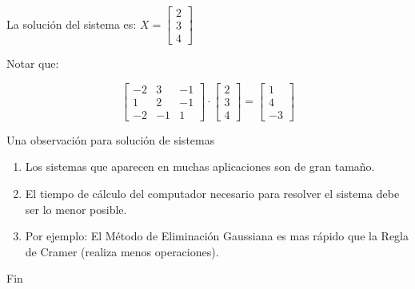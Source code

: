 La solución del sistema es:
$
X=
\begin{bmatrix}
2\\ 
3\\
4
\end{bmatrix}
$

Notar que:

$$\begin{bmatrix}
-2  &  3   & -1\\ 
1   & 2    & -1 \\
-2  &  -1  & 1 
\end{bmatrix}
 \cdot
\begin{bmatrix}
2\\ 
3 \\
4
\end{bmatrix}
=
\begin{bmatrix}
1\\ 
4 \\
-3
\end{bmatrix}
$$


{Una observación para solución de sistemas}

\begin{enumerate}
\item
Los sistemas que aparecen en muchas aplicaciones son de gran tama\~no. 
\item
El tiempo de cálculo del computador necesario para resolver el sistema debe ser lo menor posible. 

\item
Por ejemplo: El Método de Eliminación Gaussiana es mas rápido que la Regla de Cramer (realiza menos operaciones).
\end{enumerate}


{Fin}




